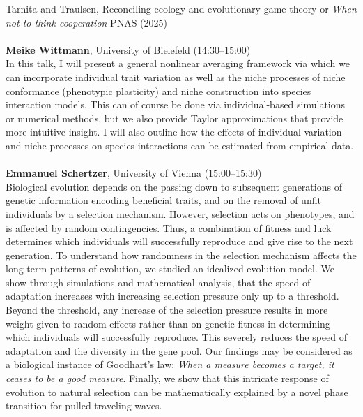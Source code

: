 \documentclass[12pt,a4paper]{article}
\begin{document}
 Tarnita and Traulsen, Reconciling ecology and evolutionary game theory or {\em When not to think cooperation} PNAS (2025) \\
\\[1ex]{ \large \textbf{ Meike Wittmann}}, University of Bielefeld (14:30--15:00) \\[2ex] In this talk, I will present a general nonlinear averaging framework via which we can incorporate individual trait variation as well as the niche processes of niche conformance (phenotypic plasticity) and niche construction into species interaction models. This can of course be done via individual-based simulations or numerical methods, but we also provide Taylor approximations that provide more intuitive insight. I will also outline how the effects of individual variation and niche processes on species interactions can be estimated from empirical data. \\
\\[1ex]{ \large \textbf{ Emmanuel Schertzer}}, University of Vienna (15:00--15:30) \\[2ex] Biological evolution depends on the passing down to subsequent generations of genetic information encoding beneficial traits, and on the removal of unfit individuals by a selection mechanism. However, selection acts on phenotypes, and is affected by random contingencies. Thus, a combination of fitness and luck determines which individuals will successfully reproduce and give rise to the next generation. To understand how randomness in the selection mechanism affects the long-term patterns of evolution, we studied an idealized evolution model. We show through simulations and mathematical analysis, that the speed of adaptation increases with increasing selection pressure only up to a threshold. Beyond the threshold, any increase of the selection pressure results in more weight given to random effects rather than on genetic fitness in determining which individuals will successfully reproduce. This severely reduces the speed of adaptation and the diversity in the gene pool. Our findings may be considered as a biological instance of  Goodhart's law: {\em When a measure becomes a target, it ceases to be a good measure}. Finally, we show that this intricate response of evolution to natural selection can be mathematically explained by a novel phase transition for pulled traveling waves. \\
\end{document}
